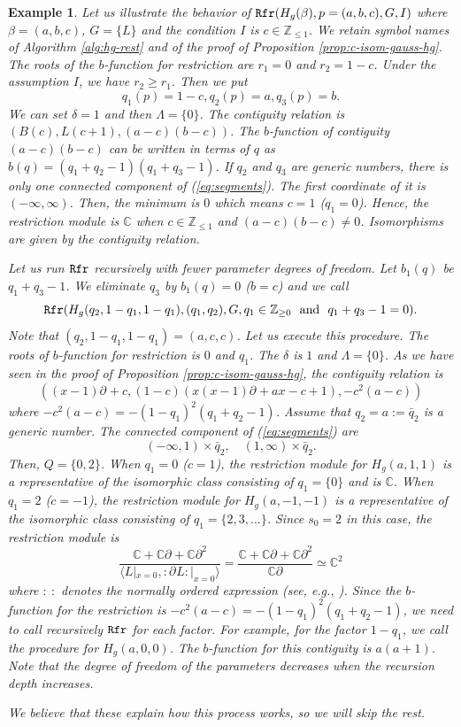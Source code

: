 \documentclass{article}
\def\CC{\mathbb{C}}
\def\ZZ{\mathbb{Z}}
\def\pd#1{\partial_{#1}}
\def\aalpha{a}
\def\bbeta{b}
\def\ggamma{c}
\def\Hg{H_g}
\newtheorem{example}{Example}
\begin{document}
\begin{example}\rm \label{ex:2F1-Rfr}
Let us illustrate the behavior of $\mbox{\tt Rfr}(\Hg(\beta),p=(a,b,c),G,I)$
where $\beta=(a,b,c)$,
$G=\{ L \}$ and the condition $I$ is $c \in \ZZ_{\leq 1}$.
We retain symbol names of Algorithm \ref{alg:hg-rest}
and of the proof of Proposition \ref{prop:c-isom-gauss-hg}.
The roots of the $b$-function for restriction
are $r_1=0$ and $r_2=1-c$.
Under the assumption $I$, we have $r_2 \geq r_1$.
Then we put
$$ 
 q_1(p)=1-c, q_2(p)=a, q_3(p)=b. 
$$
We can set $\delta=1$ and then $\Lambda=\{ 0 \}$.
The contiguity relation is 
$(B(c), L(c+1), (a-c)(b-c))$.
The $b$-function of contiguity
$(a-c)(b-c)$ can be written in terms of $q$ as
$b(q)=(q_1+q_2-1)(q_1+q_3-1)$.
If $q_2$ and $q_3$ are generic numbers,
there is only one connected component
of (\ref{eq:segments}).
The first coordinate of it is $(-\infty,\infty)$.
Then, the minimum is $0$ which means
$c=1$ ($q_1=0$).
Hence, the restriction module is $\CC$ 
when $c \in \ZZ_{\leq 1}$ and $(a-c)(b-c)\not=0$.
Isomorphisms are given by the contiguity relation.

Let us run $\mbox{\tt Rfr}$ recursively with fewer parameter degrees of freedom.
Let $b_1(q)$ be $q_1+q_3-1$.
We eliminate $q_3$ by $b_1(q)=0$ ($b=c$) and we call
$$
 \mbox{\tt Rfr}(\Hg(q_2,1-q_1,1-q_1),(q_1,q_2),G,
  q_1 \in \ZZ_{\geq 0} \ \mbox{ and }\ q_1+q_3-1=0).
$$
Note that $(q_2,1-q_1,1-q_1)=(a,c,c)$.
Let us execute this procedure.
The roots of $b$-function for restriction is $0$ and $q_1$.
The $\delta$ is $1$ and $\Lambda=\{ 0 \}$.
As we have seen in the proof of Proposition \ref{prop:c-isom-gauss-hg},
the contiguity relation is
$$
\left(
 (x-1)\pd{}+c,
 (1-c)\left( x(x-1)\pd{} + ax - c +1 \right),
 -c^2(a-c)
\right) 
$$
where $-c^2(a-c)=-(1-q_1)^2(q_1+q_2-1)$.
Assume that $q_2=a:={\bar q}_2$ is a generic number.
The connected component of (\ref{eq:segments})
are
$$
(-\infty,1) \times {\bar q}_2, \quad (1,\infty) \times {\bar q}_2.
$$
Then, $Q=\{ 0, 2 \}$.
When $q_1=0$ ($c=1$), the restriction module for $\Hg(a,1,1)$
is a representative of the isomorphic class consisting of $q_1=\{0\}$
and is $\CC$.
When $q_1=2$ ($c=-1$), the restriction module for $\Hg(a,-1,-1)$
is a representative of the isomorphic class consisting of $q_1=\{2,3,\ldots\}$.
Since $s_0=2$ in this case,
the restriction module is
$$
\frac{\CC + \CC \pd{} + \CC \pd{}^2}
 { \langle L|_{x=0}, :\pd{}L: |_{x=0} \rangle }
= \frac{\CC + \CC \pd{} + \CC \pd{}^2}{\CC \pd{}} 
\simeq \CC^2
$$
where $: \ : $ denotes the normally ordered expression
(see, e.g., \cite[p.3]{SST}).
Since the $b$-function for the restriction is 
$-c^2(a-c)=-(1-q_1)^2 (q_1+q_2-1)$,
we need to call recursively $\mbox{\tt Rfr}$
for each factor.
For example, for the factor $1-q_1$,
we call the procedure for
$\Hg(a,0,0)$.
The $b$-function for this contiguity is $a(a+1)$.
Note that the degree of freedom of the parameters decreases when the recursion depth increases.

We believe that these explain how this process works, so we will skip the rest.
\end{example}
\end{document}
